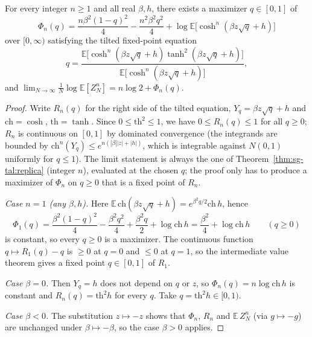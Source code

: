 \begin{theorem}\label{thm:sg-tal:replica-fixed-point}
\leanok
{}
For every integer $n \ge 1$ and all real $\beta, h$, there exists a maximizer $q \in [0, 1]$ of
\[
\Phi_n(q) = \frac{n \beta^2 (1-q)^2}{4} - \frac{n^2 \beta^2 q^2}{4} + \log \mathbb E \bigl[\cosh^n(\beta z \sqrt{q} + h)\bigr]
\]
over $[0, \infty)$ satisfying the tilted fixed-point equation
\[
q = \frac{\mathbb E \bigl[\cosh^n(\beta z \sqrt{q} + h) \tanh^2(\beta z \sqrt{q} + h)\bigr]}{\mathbb E \bigl[\cosh^n(\beta z \sqrt{q} + h)\bigr]},
\]
and $\lim_{N \to \infty} \frac{1}{N} \log \mathbb E [Z_N^n] = n \log 2 + \Phi_n(q)$.
\end{theorem}
\begin{proof}
\leanok
Write $R_n(q)$ for the right side of the tilted equation, $Y_q=\beta z\sqrt q+h$ and $\mathrm{ch}=\cosh$, $\mathrm{th}=\tanh$. Since $0\le\mathrm{th}^2\le1$, we have $0\le R_n(q)\le1$ for all $q\ge0$; $R_n$ is continuous on $[0,1]$ by dominated convergence (the integrands are bounded by $\mathrm{ch}^n(Y_q)\le e^{n(|\beta||z|+|h|)}$, which is integrable against $N(0,1)$ uniformly for $q\le1$).
The limit statement is always the one of Theorem~\ref{thm:sg-tal:replica} (integer $n$), evaluated at the chosen $q$; the proof only has to produce a maximizer of $\Phi_n$ on $q\ge0$ that is a fixed point of $R_n$.

\emph{Case $n=1$ (any $\beta,h$).} Here $\mathbb E\,\mathrm{ch}(\beta z\sqrt q+h)=e^{\beta^2q/2}\mathrm{ch}\,h$, hence
\[
\Phi_1(q)=\frac{\beta^2(1-q)^2}4-\frac{\beta^2q^2}4+\frac{\beta^2q}2+\log\mathrm{ch}\,h=\frac{\beta^2}4+\log\mathrm{ch}\,h\qquad(q\ge0)
\]
is constant, so every $q\ge0$ is a maximizer. The continuous function $q\mapsto R_1(q)-q$ is $\ge0$ at $q=0$ and $\le0$ at $q=1$, so the intermediate value theorem gives a fixed point $q\in[0,1]$ of $R_1$.

\emph{Case $\beta=0$.} Then $Y_q=h$ does not depend on $q$ or $z$, so $\Phi_n(q)=n\log\mathrm{ch}\,h$ is constant and $R_n(q)=\mathrm{th}^2h$ for every $q$. Take $q=\mathrm{th}^2h\in[0,1)$.

\emph{Case $\beta<0$.} The substitution $z\mapsto-z$ shows that $\Phi_n$, $R_n$ and $\mathbb E\,Z_N^n$ (via $g\mapsto-g$) are unchanged under $\beta\mapsto-\beta$, so the case $\beta>0$ applies.


\end{proof}
